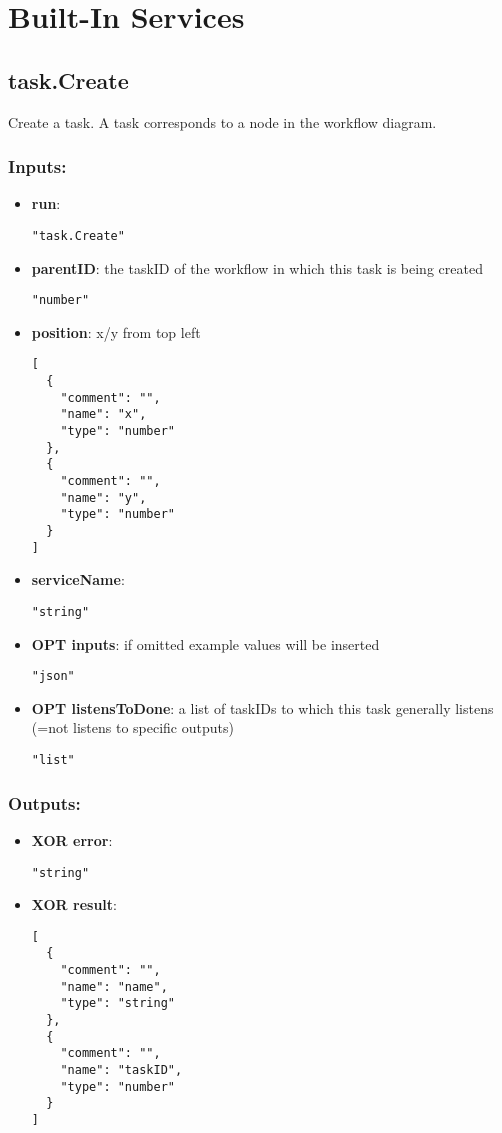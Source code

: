 \section{Built-In Services}
\label{ch:builtinservices}

\subsection{task.Create}
Create a task. A task corresponds to a node in the workflow diagram.
\subsubsection*{Inputs:}
\begin{itemize}
    \item \textbf{run}: 
\begin{lstlisting}
"task.Create"
\end{lstlisting}
    \item \textbf{parentID}: the taskID of the workflow in which this task is being created
\begin{lstlisting}
"number"
\end{lstlisting}
    \item \textbf{position}: x/y from top left
\begin{lstlisting}
[
  {
    "comment": "", 
    "name": "x", 
    "type": "number"
  }, 
  {
    "comment": "", 
    "name": "y", 
    "type": "number"
  }
]
\end{lstlisting}
    \item \textbf{serviceName}: 
\begin{lstlisting}
"string"
\end{lstlisting}
    \item \textbf{OPT inputs}: if omitted example values will be inserted
\begin{lstlisting}
"json"
\end{lstlisting}
    \item \textbf{OPT listensToDone}: a list of taskIDs to which this task generally listens (=not listens to specific outputs)
\begin{lstlisting}
"list"
\end{lstlisting}
  \end{itemize}

\subsubsection*{Outputs:}
\begin{itemize}
    \item \textbf{XOR error}: 
\begin{lstlisting}
"string"
\end{lstlisting}
    \item \textbf{XOR result}: 
\begin{lstlisting}
[
  {
    "comment": "", 
    "name": "name", 
    "type": "string"
  }, 
  {
    "comment": "", 
    "name": "taskID", 
    "type": "number"
  }
]
\end{lstlisting}
  \end{itemize}

